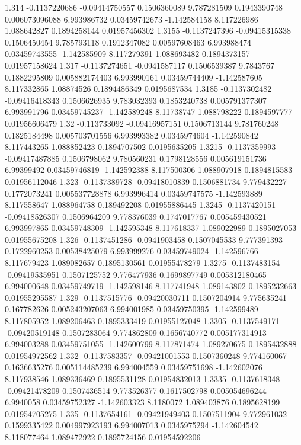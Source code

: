 {1.314 -0.1137220686 -0.09414750557 0.1506360089 9.787281509 0.1943390748 0.006073096088 6.993986732 0.03459742673 -1.142584158 8.117226986 1.088642827 0.1894258144 0.01957456302
1.3155 -0.1137247396 -0.09415315338 0.1506450454 9.785793118 0.1912347082 0.00597608463 6.993988474 0.03459743555 -1.142585909 8.117279391 1.088693482 0.1894373157 0.01957158624
1.317 -0.1137274651 -0.0941587117 0.1506539387 9.7843767 0.1882295809 0.005882174403 6.993990161 0.03459744409 -1.142587605 8.117332865 1.08874526 0.1894486349 0.0195687534
1.3185 -0.1137302482 -0.09416418343 0.1506626935 9.783032393 0.1853240738 0.005791377307 6.993991796 0.03459745237 -1.142589248 8.11738747 1.088798222 0.1894597777 0.01956606479
1.32 -0.113733092 -0.09416957151 0.1506713144 9.781760248 0.1825184498 0.005703701556 6.993993382 0.0345974604 -1.142590842 8.117443265 1.088852423 0.1894707502 0.0195635205
1.3215 -0.1137359993 -0.09417487885 0.1506798062 9.780560231 0.1798128556 0.005619151736 6.99399492 0.03459746819 -1.142592388 8.117500306 1.088907918 0.1894815583 0.01956112046
1.323 -0.1137389728 -0.09418010839 0.1506881734 9.779432227 0.1772073241 0.005537728878 6.993996414 0.03459747575 -1.142593889 8.117558647 1.088964758 0.189492208 0.01955886445
1.3245 -0.1137420151 -0.09418526307 0.1506964209 9.778376039 0.1747017767 0.005459430521 6.993997865 0.03459748309 -1.142595348 8.117618337 1.089022989 0.1895027053 0.01955675208
1.326 -0.1137451286 -0.0941903458 0.1507045533 9.777391393 0.1722960253 0.00538425079 6.993999276 0.03459749024 -1.142596766 8.117679423 1.089082657 0.1895130561 0.01955478279
1.3275 -0.1137483154 -0.09419535951 0.1507125752 9.776477936 0.1699897749 0.005312180465 6.994000648 0.03459749719 -1.142598146 8.117741948 1.089143802 0.1895232663 0.01955295587
1.329 -0.1137515776 -0.09420030711 0.1507204914 9.775635241 0.167782626 0.005243207063 6.994001985 0.03459750395 -1.142599489 8.117805952 1.089206463 0.1895333419 0.01955127048
1.3305 -0.1137549171 -0.09420519148 0.1507283064 9.774862809 0.1656740772 0.005177314913 6.994003288 0.03459751055 -1.142600799 8.117871474 1.089270675 0.1895432888 0.01954972562
1.332 -0.1137583357 -0.09421001553 0.1507360248 9.774160067 0.1636635276 0.005114485239 6.994004559 0.03459751698 -1.142602076 8.117938546 1.089336469 0.1895531128 0.01954832013
1.3335 -0.1137618348 -0.09421478209 0.1507436514 9.773526377 0.1617502798 0.005054696244 6.9940058 0.03459752327 -1.142603323 8.1180072 1.089403876 0.1895628199 0.01954705275
1.335 -0.1137654161 -0.09421949403 0.1507511904 9.772961032 0.1599335422 0.004997923193 6.994007013 0.0345975294 -1.142604542 8.118077464 1.089472922 0.1895724156 0.01954592206
}
